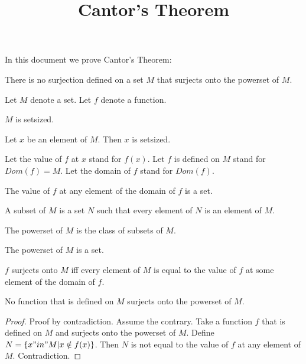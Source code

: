 \documentclass{article}
\title{Cantor's Theorem}
\author{}
\date{}
\begin{document}

  \maketitle

  In this document we prove Cantor's Theorem:

  \begin{theorem}
    There is no surjection defined on a set $M$ that surjects onto the powerset of $M$.
  \end{theorem}

  \begin{forthel}

    Let $M$ denote a set. Let $f$ denote a function.

    \begin{axiom}
        $M$ is setsized.
    \end{axiom}

    \begin{axiom}
        Let $x$ be an element of $M$. Then $x$ is setsized.
    \end{axiom}

    Let the value of $f$ at $x$ stand for $f(x)$. Let $f$ is defined on $M$ stand for $Dom(f) = M$. Let the domain of $f$ stand for $Dom(f)$.


    \begin{axiom}
      The value of $f$ at any element of the domain of $f$ is a set.
    \end{axiom}

    \begin{definition}[Subset]
      A subset of $M$ is a set $N$ such that every element of $N$ is an element of $M$.
    \end{definition}

    \begin{definition}
      The powerset of $M$ is the class of subsets of $M$.
    \end{definition}

    \begin{axiom}
      The powerset of $M$ is a set.
    \end{axiom}

    \begin{definition}
      $f$ surjects onto $M$ iff every element of $M$ is equal to the value of $f$ at some element of the domain of $f$.
    \end{definition}

    \begin{proposition}
      No function that is defined on $M$ surjects onto the powerset of $M$.
    \end{proposition}
    \begin{proof}
      Proof by contradiction. Assume the contrary.
      Take a function $f$ that is defined on $M$ and surjects onto the powerset of $M$.
      Define $N = \{ x "in" M | x \notin f(x) \}$.
      Then $N$ is not equal to the value of $f$ at any element of $M$. Contradiction.
    \end{proof}

  \end{forthel}
\end{document}
